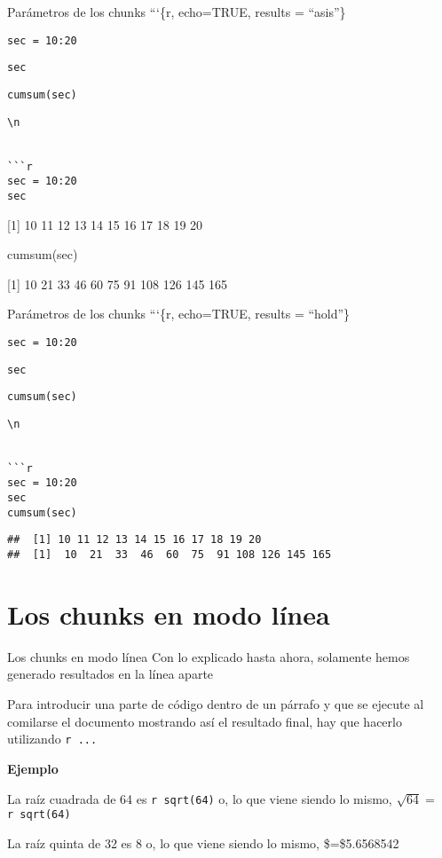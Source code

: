 \documentclass[
  ignorenonframetext,
]{beamer}
\newenvironment{Shaded}{\begin{snugshade}}{\end{snugshade}}
\newcommand{\FunctionTok}[1]{\textcolor[rgb]{0.00,0.00,0.00}{#1}}
\newcommand{\NormalTok}[1]{#1}
\begin{document}
\begin{frame}[fragile]{Parámetros de los chunks}
\protect\hypertarget{paruxe1metros-de-los-chunks-4}{}
```\{r, echo=TRUE, results = ``asis''\}

\texttt{sec\ =\ 10:20}

\texttt{sec}

\texttt{cumsum(sec)}

\begin{verbatim}
\n


```r
sec = 10:20
sec
\end{verbatim}

{[}1{]} 10 11 12 13 14 15 16 17 18 19 20

\begin{Shaded}
\begin{Highlighting}[]
\FunctionTok{cumsum}\NormalTok{(sec)}
\end{Highlighting}
\end{Shaded}

{[}1{]} 10 21 33 46 60 75 91 108 126 145 165
\end{frame}

\begin{frame}[fragile]{Parámetros de los chunks}
\protect\hypertarget{paruxe1metros-de-los-chunks-5}{}
```\{r, echo=TRUE, results = ``hold''\}

\texttt{sec\ =\ 10:20}

\texttt{sec}

\texttt{cumsum(sec)}

\begin{verbatim}
\n


```r
sec = 10:20
sec
cumsum(sec)
\end{verbatim}

\begin{verbatim}
##  [1] 10 11 12 13 14 15 16 17 18 19 20
##  [1]  10  21  33  46  60  75  91 108 126 145 165
\end{verbatim}
\end{frame}

\hypertarget{los-chunks-en-modo-luxednea}{%
\section{Los chunks en modo línea}\label{los-chunks-en-modo-luxednea}}

\begin{frame}[fragile]{Los chunks en modo línea}
\protect\hypertarget{los-chunks-en-modo-luxednea-1}{}
Con lo explicado hasta ahora, solamente hemos generado resultados en la
línea aparte

Para introducir una parte de código dentro de un párrafo y que se
ejecute al comilarse el documento mostrando así el resultado final, hay
que hacerlo utilizando \texttt{\textasciigrave{}r\ ...\textasciigrave{}}

\textbf{Ejemplo}

La raíz cuadrada de 64 es
\texttt{\textasciigrave{}r\ sqrt(64)\textasciigrave{}} o, lo que viene
siendo lo mismo,
\(\sqrt{64}=\)\texttt{\textasciigrave{}r\ sqrt(64)\textasciigrave{}}

La raíz quinta de 32 es 8 o, lo que viene siendo lo mismo,
\$=\$5.6568542
\end{frame}
\end{document}
